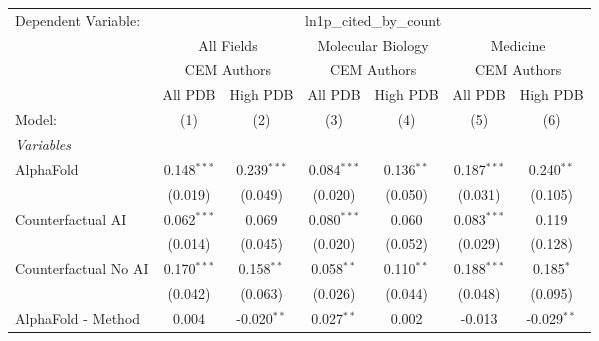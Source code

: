 \begingroup
\centering
\begin{tabular}{lcccccc}
   \tabularnewline \midrule \midrule
   Dependent Variable: & \multicolumn{6}{c}{ln1p\_cited\_by\_count}\\
 & \multicolumn{2}{c}{All Fields} & \multicolumn{2}{c}{Molecular Biology} & \multicolumn{2}{c}{Medicine} \\
\cmidrule(lr){2-3} \cmidrule(lr){4-5} \cmidrule(lr){6-7}
 & \multicolumn{2}{c}{CEM Authors} & \multicolumn{2}{c}{CEM Authors} & \multicolumn{2}{c}{CEM Authors} \\
\cmidrule(lr){2-3} \cmidrule(lr){4-5} \cmidrule(lr){6-7}
 & \multicolumn{1}{c}{All PDB} & \multicolumn{1}{c}{High PDB} & \multicolumn{1}{c}{All PDB} & \multicolumn{1}{c}{High PDB} & \multicolumn{1}{c}{All PDB} & \multicolumn{1}{c}{High PDB} \\
\cmidrule(lr){2-2} \cmidrule(lr){3-3} \cmidrule(lr){4-4} \cmidrule(lr){5-5} \cmidrule(lr){6-6} \cmidrule(lr){7-7}
   Model:                                                     & (1)           & (2)           & (3)           & (4)          & (5)           & (6)\\  
   \midrule
   \emph{Variables}\\
   AlphaFold                                                  & 0.148$^{***}$ & 0.239$^{***}$ & 0.084$^{***}$ & 0.136$^{**}$ & 0.187$^{***}$ & 0.240$^{**}$\\   
                                                              & (0.019)       & (0.049)       & (0.020)       & (0.050)      & (0.031)       & (0.105)\\   
   Counterfactual AI                                          & 0.062$^{***}$ & 0.069         & 0.080$^{***}$ & 0.060        & 0.083$^{***}$ & 0.119\\   
                                                              & (0.014)       & (0.045)       & (0.020)       & (0.052)      & (0.029)       & (0.128)\\   
   Counterfactual No AI                                       & 0.170$^{***}$ & 0.158$^{**}$  & 0.058$^{**}$  & 0.110$^{**}$ & 0.188$^{***}$ & 0.185$^{*}$\\   
                                                              & (0.042)       & (0.063)       & (0.026)       & (0.044)      & (0.048)       & (0.095)\\   
   AlphaFold - Method                                         & 0.004         & -0.020$^{**}$ & 0.027$^{**}$  & 0.002        & -0.013        & -0.029$^{**}$\\   

\end{tabular}
